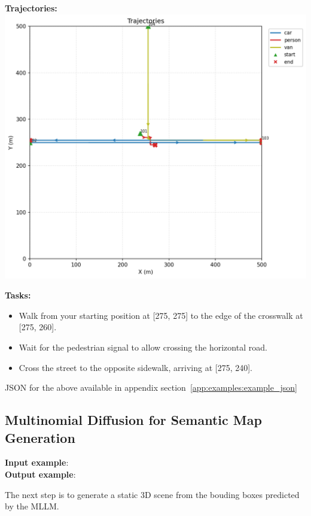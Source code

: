 \documentclass{article}
\begin{document}
\begin{tcolorbox}[examplebox, title=Scene Specification Format]
\textbf{Trajectories:}\\
\includegraphics[width=0.8\linewidth]{images/gemini_dynamic.png}



\textbf{Tasks:}
\begin{itemize}[leftmargin=1.2em]
    \item Walk from your starting position at [275, 275] to the edge of the crosswalk at [275, 260].
    \item Wait for the pedestrian signal to allow crossing the horizontal road.
    \item Cross the street to the opposite sidewalk, arriving at [275, 240].
\end{itemize}

JSON for the above available in appendix section~\ref{app:examples:example_json}


\end{tcolorbox}

\subsection{Multinomial Diffusion for Semantic Map Generation}

\begin{tcolorbox}

\textbf{Input example}: \\



\textbf{Output example}: \\

\end{tcolorbox}

The next step is to generate a static 3D scene from the bouding boxes predicted by the MLLM.
\end{document}
